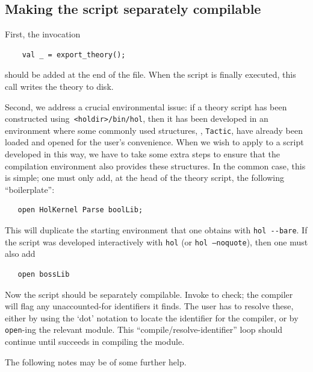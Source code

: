 \subsection{Making the script separately compilable}

First, the invocation
\begin{verbatim}
    val _ = export_theory();
\end{verbatim}
should be added at the end of the file. When the script is finally
executed, this call writes the theory to disk.

Second, we address a crucial environmental issue: if a theory script
has been constructed using\verb+ <holdir>/bin/hol+, then it has been
developed in an environment where some commonly used structures, \eg,
\verb+Tactic+, have already been loaded and opened for the user's
convenience. When we wish to apply \holmake{} to a script developed
in this way, we have to take some extra steps to ensure that the
compilation environment also provides these structures.  In the common
case, this is simple; one must only add, at the head of the theory
script, the following ``boilerplate'':
\begin{verbatim}
   open HolKernel Parse boolLib;
\end{verbatim}
This will duplicate the starting environment that one obtains with
\verb+hol --bare+.  If the script was
developed interactively with \texttt{hol} (or \texttt{hol --noquote}),
then one must also add
\begin{verbatim}
   open bossLib
\end{verbatim}
Now the script should be separately compilable. Invoke \holmake{}
to check; the \ML{} compiler will flag any unaccounted-for identifiers it finds.
The user has to resolve these, either by using the `dot' notation to
locate the identifier for the compiler, or by \verb+open+-ing the
relevant module. This ``compile/resolve-identifier'' loop should
continue until \holmake{} succeeds in compiling the module.

The following notes may be of some further help.

